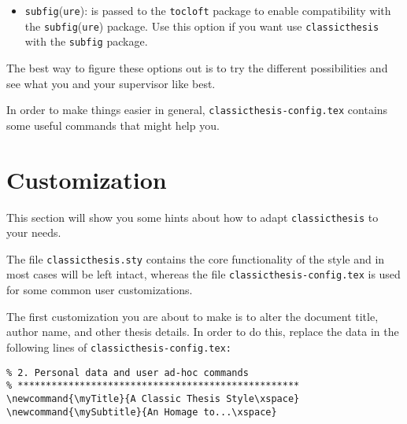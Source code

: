 \begin{itemize}
\begin{itemize}
        \item\texttt{subfig}(\texttt{ure}): is passed to the \texttt{tocloft} 
        package to enable compatibility with the \texttt{subfig}(\texttt{ure}) 
        package. Use this option if you want use \texttt{classicthesis} with the
        \texttt{subfig} package.
        
        \end{itemize}    
 

   \end{itemize}
The best way to figure these options out is to try the different
possibilities and see what you and your supervisor like best.

In order to make things easier in general, 
\texttt{classicthesis-config.tex} 
contains some useful commands that might help you.


\section{Customization}\label{sec:custom}
This section will show you some hints about how to adapt 
\texttt{classicthesis} to your needs.

The file \texttt{classicthesis.sty}
contains the core functionality of the style and in most cases will
be left intact, whereas the file \texttt{classic\-thesis-config.tex}
is used for some common user customizations. 

The first customization you are about to make is to alter the document
title, author name, and other thesis details. In order to do this, replace
the data in the following lines of \texttt{classicthesis-config.tex:}%

\begin{lstlisting}[frame=lt]
% **************************************************
% 2. Personal data and user ad-hoc commands
% **************************************************
\newcommand{\myTitle}{A Classic Thesis Style\xspace} 
\newcommand{\mySubtitle}{An Homage to...\xspace} 
\end{lstlisting}

